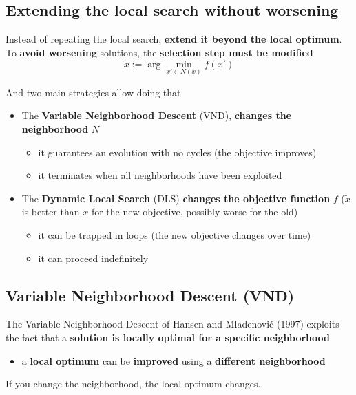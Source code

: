 \documentclass[11pt]{article}
\begin{document}
	\newpage
	
	\subsection{Extending the local search without worsening}
	
	Instead of repeating the local search, \textbf{extend it beyond the local optimum}.\\
	
	To \textbf{avoid worsening} solutions, the \textbf{selection step must be modified}
	$$ \tilde{x} := \arg \min_{x' \in N(x)} f (x') $$
	
	And two main strategies allow doing that
	\begin{itemize}
		\item The \textbf{Variable Neighborhood Descent} (VND), \textbf{changes the neighborhood} $N$
		\begin{itemize}
			\item it guarantees an evolution with no cycles (the objective improves)
			\item it terminates when all neighborhoods have been exploited
		\end{itemize}
		\nn
		
		\item The \textbf{Dynamic Local Search} (DLS) \textbf{changes the objective function} $f$ ($\tilde{x}$ is better than $x$ for the new objective, possibly worse for the old)
		\begin{itemize}
			\item it can be trapped in loops (the new objective changes over time)
			\item it can proceed indefinitely
		\end{itemize}
		\nn
	\end{itemize}
	
	\newpage
	
	\subsection{Variable Neighborhood Descent (VND)}
	
	The Variable Neighborhood Descent of Hansen and Mladenovi\'c (1997) exploits the fact that a \textbf{solution is locally optimal for a specific neighborhood}
	\begin{itemize}
		\item a \textbf{local optimum} can be \textbf{improved} using a \textbf{different neighborhood}
	\end{itemize}
	If you change the neighborhood, the local optimum changes.\\
	
\end{document}
